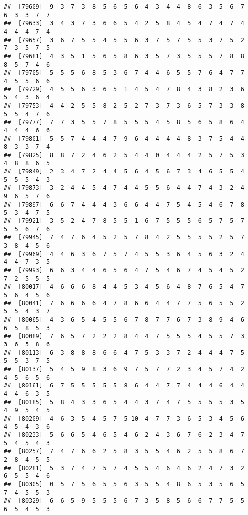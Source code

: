 \documentclass[
]{book}
\begin{document}
\begin{verbatim}
##  [79609]  9  3  7  3  8  5  6  5  6  4  3  4  4  8  6  3  5  6  7  6  3  3  7  7
##  [79633]  3  4  3  7  3  6  6  5  4  2  5  8  4  5  4  7  4  7  4  4  4  4  7  4
##  [79657]  3  6  7  5  5  4  5  5  6  3  7  5  7  5  5  3  7  5  2  7  3  5  7  5
##  [79681]  4  3  5  1  5  6  5  8  6  3  5  7  3  5  5  5  7  8  8  8  5  7  4  6
##  [79705]  5  5  5  6  8  5  3  6  7  4  4  6  5  5  7  6  4  7  7  4  5  5  6  6
##  [79729]  4  5  5  6  3  6  5  1  4  5  4  7  8  4  3  8  2  3  6  5  4  3  6  4
##  [79753]  4  4  2  5  5  8  2  5  2  7  3  7  3  6  5  7  3  3  8  5  5  4  7  6
##  [79777]  7  7  3  5  5  7  8  5  5  5  4  5  8  5  6  5  8  6  4  4  4  4  6  6
##  [79801]  5  5  7  4  4  4  7  9  6  4  4  4  4  8  3  7  5  4  4  8  3  3  7  4
##  [79825]  8  8  7  2  4  6  2  5  4  4  0  4  4  4  2  5  7  5  3  4  8  8  6  5
##  [79849]  2  3  4  7  2  4  4  5  6  4  5  6  7  3  4  6  5  5  4  5  5  5  4  3
##  [79873]  3  2  4  4  5  4  7  4  4  5  5  6  4  4  7  4  3  2  4  9  6  5  7  6
##  [79897]  6  6  7  4  4  4  3  6  6  4  4  7  5  4  5  4  6  7  8  5  3  4  7  5
##  [79921]  3  5  2  4  7  8  5  5  1  6  7  5  5  5  6  5  7  5  7  5  5  6  7  6
##  [79945]  7  4  7  6  4  5  2  5  7  8  4  2  5  5  5  5  2  5  7  3  8  4  5  6
##  [79969]  4  4  6  3  6  7  5  7  4  5  5  3  6  4  5  6  3  2  4  4  4  7  3  5
##  [79993]  6  6  3  4  4  6  5  6  4  7  5  4  6  7  4  5  4  5  2  7  2  5  5  5
##  [80017]  4  6  6  6  8  4  4  5  3  4  5  6  4  8  7  6  5  4  7  5  6  4  5  6
##  [80041]  7  6  6  6  6  4  7  8  6  6  4  4  7  7  5  6  5  5  2  5  5  4  3  7
##  [80065]  4  3  6  5  4  5  5  6  7  8  7  7  6  7  3  8  9  4  6  6  5  8  5  3
##  [80089]  7  6  5  7  2  2  2  8  4  4  7  5  5  5  4  5  5  7  3  3  6  5  8  6
##  [80113]  6  3  8  8  8  6  6  4  7  5  3  3  7  2  4  4  4  7  5  5  5  3  7  5
##  [80137]  5  4  5  9  8  3  6  9  7  5  7  7  2  3  4  5  7  4  2  4  5  6  5  6
##  [80161]  6  7  5  5  5  5  5  8  6  4  4  7  7  4  4  4  6  4  4  4  4  6  3  5
##  [80185]  5  8  4  3  3  6  5  4  4  3  7  4  7  5  5  5  5  3  5  4  9  5  4  5
##  [80209]  4  6  3  5  4  5  7  5 10  4  7  7  3  6  5  3  4  5  6  4  5  4  3  6
##  [80233]  5  6  6  5  4  6  5  4  6  2  4  3  6  7  6  2  3  4  7  5  4  5  4  3
##  [80257]  7  4  7  6  6  2  5  8  3  5  5  4  6  2  5  5  8  6  7  2  8  4  5  5
##  [80281]  5  3  7  4  7  5  7  4  5  5  4  6  4  6  2  4  7  3  2  6  5  5  4  6
##  [80305]  0  5  7  5  6  5  5  6  3  5  5  4  8  6  5  3  5  6  5  7  4  5  5  3
##  [80329]  6  6  5  9  5  5  5  6  7  3  5  8  5  6  6  7  7  5  5  6  5  4  5  3

\end{verbatim}
\end{document}
